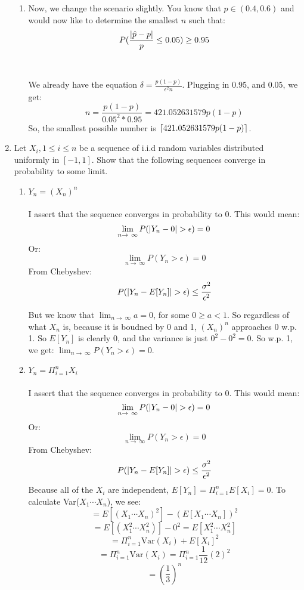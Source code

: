 \begin{enumerate}
\begin{enumerate}
      \item Now, we change the scenario slightly. You know that $p \in (0.4, 0.6)$ and would now like to determine the smallest $n$ such that:
        $$P(\frac{\left\vert \hat{p} - p \right\vert}{p} \leq 0.05) \geq 0.95$$\\\\

        We already have the equation $\delta = \frac{p(1-p)}{\epsilon^2 n}$.
        Plugging in $0.95$, and $0.05$, we get:
        $$n = \frac{p(1-p)}{0.05^2 * 0.95} = 421.052631579 p(1-p)$$
        So, the smallest possible number is $\lceil421.052631579 p(1-p)\rceil$.
    \end{enumerate}

  \item Let $X_i, 1 \leq i \leq n$ be a sequence of i.i.d random variables distributed uniformly in $[-1, 1]$. Show that the following sequences converge in probability to some limit.
    \begin{enumerate}
      \item $Y_n = (X_n)^n$\\\\
        I assert that the sequence converges in probability to $0$. This would mean:
        $$\lim_{n \to\ \infty} P(\left\vert Y_n - 0 \right\vert > \epsilon) = 0$$
        Or:
        $$\lim_{n \to\ \infty} P(Y_n > \epsilon) = 0$$
        From Chebyshev:
        $$P(\left\vert Y_n -E[Y_n] \right\vert > \epsilon) \leq \frac{\sigma^2}{\epsilon^2}$$

        But we know that $\lim_{n \to\ \infty} a = 0$, for some $0 \geq a < 1$. So regardless of what $X_n$ is, because it is boudned by 0 and 1, $(X_n)^n$ approaches 0 w.p. 1. So $E[Y_n]$ is clearly $0$, and the variance is just $0^2 - 0^2 = 0$. So w.p. 1, we get:
        $\lim_{n \to\ \infty} P(Y_n > \epsilon) = 0$.

        
      \item $Y_n = \Pi_{i=1}^n X_i$\\\\

        I assert that the sequence converges in probability to $0$. This would mean:
        $$\lim_{n \to\ \infty} P(\left\vert Y_n - 0 \right\vert > \epsilon) = 0$$
        Or:
        $$\lim_{n \to\ \infty} P(Y_n > \epsilon) = 0$$
        From Chebyshev:
        $$P(\left\vert Y_n -E[Y_n] \right\vert > \epsilon) \leq \frac{\sigma^2}{\epsilon^2}$$
        Because all of the $X_i$ are independent, $E[Y_n] = \Pi_{i=1}^n E[X_i] = 0$.
        To calculate Var($X_1 \cdots X_n$), we see:
        $$=E[(X_1\cdots X_n)^2] - (E[X_1\cdots X_n])^2$$
        $$=E[(X_1^2\cdots X_n^2)] - 0^2 = E[X_1^2\cdots X_n^2]$$
        $$=\Pi_{i=1}^n \text{Var}(X_i) + E[X_i]^2$$
        $$=\Pi_{i=1}^n \text{Var}(X_i) = \Pi_{i=1}^n \frac{1}{12}(2)^2$$
        $$=(\frac{1}{3})^n$$


\end{enumerate}
\end{enumerate}
